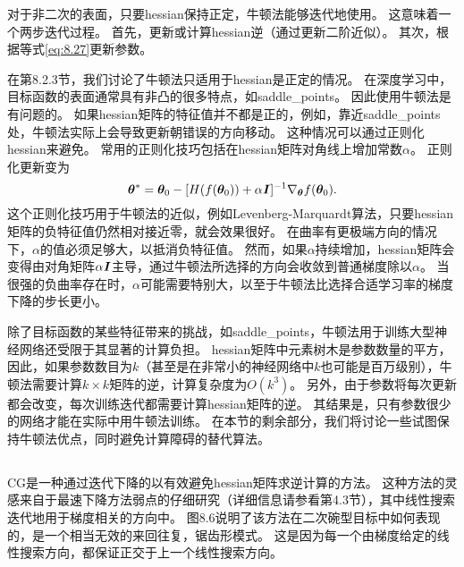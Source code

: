 对于非二次的表面，只要\gls{hessian}保持正定，牛顿法能够迭代地使用。
这意味着一个两步迭代过程。
首先，更新或计算\gls{hessian}逆（通过更新二阶近似）。
其次，根据等式\ref{eq:8.27}更新参数。


在第8.2.3节，我们讨论了牛顿法只适用于\gls{hessian}是正定的情况。
在深度学习中，目标函数的表面通常具有非凸的很多特点，如\gls{saddle_points}。
因此使用牛顿法是有问题的。
如果\gls{hessian}矩阵的特征值并不都是正的，例如，靠近\gls{saddle_points}处，牛顿法实际上会导致更新朝错误的方向移动。
这种情况可以通过正则化\gls{hessian}来避免。
常用的正则化技巧包括在\gls{hessian}矩阵对角线上增加常数$\alpha$。
正则化更新变为
\begin{equation}
    \boldsymbol{\theta}^* = \boldsymbol{\theta}_0 - [ H( f(\boldsymbol{\theta}_0)) + \alpha \boldsymbol{\mathit{I}}  ]^{-1} \nabla_{\boldsymbol{\theta}} f(\boldsymbol{\theta}_0).
\end{equation}
这个正则化技巧用于牛顿法的近似，例如Levenberg-Marquardt算法\citep{Levenberg44,Marquardt63}，只要\gls{hessian}矩阵的负特征值仍然相对接近零，就会效果很好。
在曲率有更极端方向的情况下，$\alpha$的值必须足够大，以抵消负特征值。
然而，如果$\alpha$持续增加，\gls{hessian}矩阵会变得由对角矩阵$\alpha \boldsymbol{\mathit{I}}$主导，通过牛顿法所选择的方向会收敛到普通梯度除以$\alpha$。
当很强的负曲率存在时，$\alpha$可能需要特别大，以至于牛顿法比选择合适学习率的梯度下降的步长更小。

除了目标函数的某些特征带来的挑战，如\gls{saddle_points}，牛顿法用于训练大型神经网络还受限于其显著的计算负担。
\gls{hessian}矩阵中元素树木是参数数量的平方，因此，如果参数数目为$k$（甚至是在非常小的神经网络中$k$也可能是百万级别），牛顿法需要计算$k\times k$矩阵的逆，计算复杂度为$O(k^3)$。
另外，由于参数将每次更新都会改变，每次训练迭代都需要计算\gls{hessian}矩阵的逆。
其结果是，只有参数很少的网络才能在实际中用牛顿法训练。
在本节的剩余部分，我们将讨论一些试图保持牛顿法优点，同时避免计算障碍的替代算法。

\subsection{}
\label{sec:conjugate_gradients}
\gls{CG}是一种通过迭代下降的以有效避免\gls{hessian}矩阵求逆计算的方法。
这种方法的灵感来自于最速下降方法弱点的仔细研究（详细信息请参看第4.3节），其中线性搜索迭代地用于梯度相关的方向中。
图8.6说明了该方法在二次碗型目标中如何表现的，是一个相当无效的来回往复，锯齿形模式。
这是因为每一个由梯度给定的线性搜索方向，都保证正交于上一个线性搜索方向。


